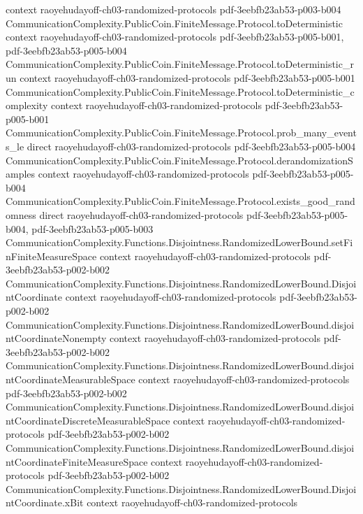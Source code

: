 \begin{theorem}
  {context}
  {raoyehudayoff-ch03-randomized-protocols}
  {pdf-3eebfb23ab53-p003-b004}
\proofstep
  {CommunicationComplexity.PublicCoin.FiniteMessage.Protocol.toDeterministic}
  {context}
  {raoyehudayoff-ch03-randomized-protocols}
  {pdf-3eebfb23ab53-p005-b001,
    pdf-3eebfb23ab53-p005-b004}
\proofstep
  {CommunicationComplexity.PublicCoin.FiniteMessage.Protocol.toDeterministic_run}
  {context}
  {raoyehudayoff-ch03-randomized-protocols}
  {pdf-3eebfb23ab53-p005-b001}
\proofstep
  {CommunicationComplexity.PublicCoin.FiniteMessage.Protocol.toDeterministic_complexity}
  {context}
  {raoyehudayoff-ch03-randomized-protocols}
  {pdf-3eebfb23ab53-p005-b001}
\proofstep
  {CommunicationComplexity.PublicCoin.FiniteMessage.Protocol.prob_many_events_le}
  {direct}
  {raoyehudayoff-ch03-randomized-protocols}
  {pdf-3eebfb23ab53-p005-b004}
\proofstep
  {CommunicationComplexity.PublicCoin.FiniteMessage.Protocol.derandomizationSamples}
  {context}
  {raoyehudayoff-ch03-randomized-protocols}
  {pdf-3eebfb23ab53-p005-b004}
\proofstep
  {CommunicationComplexity.PublicCoin.FiniteMessage.Protocol.exists_good_randomness}
  {direct}
  {raoyehudayoff-ch03-randomized-protocols}
  {pdf-3eebfb23ab53-p005-b004,
    pdf-3eebfb23ab53-p005-b003}
\proofstep
  {CommunicationComplexity.Functions.Disjointness.RandomizedLowerBound.setFinFiniteMeasureSpace}
  {context}
  {raoyehudayoff-ch03-randomized-protocols}
  {pdf-3eebfb23ab53-p002-b002}
\proofstep
  {CommunicationComplexity.Functions.Disjointness.RandomizedLowerBound.DisjointCoordinate}
  {context}
  {raoyehudayoff-ch03-randomized-protocols}
  {pdf-3eebfb23ab53-p002-b002}
\proofstep
  {CommunicationComplexity.Functions.Disjointness.RandomizedLowerBound.disjointCoordinateNonempty}
  {context}
  {raoyehudayoff-ch03-randomized-protocols}
  {pdf-3eebfb23ab53-p002-b002}
\proofstep
  {CommunicationComplexity.Functions.Disjointness.RandomizedLowerBound.disjointCoordinateMeasurableSpace}
  {context}
  {raoyehudayoff-ch03-randomized-protocols}
  {pdf-3eebfb23ab53-p002-b002}
\proofstep
  {CommunicationComplexity.Functions.Disjointness.RandomizedLowerBound.disjointCoordinateDiscreteMeasurableSpace}
  {context}
  {raoyehudayoff-ch03-randomized-protocols}
  {pdf-3eebfb23ab53-p002-b002}
\proofstep
  {CommunicationComplexity.Functions.Disjointness.RandomizedLowerBound.disjointCoordinateFiniteMeasureSpace}
  {context}
  {raoyehudayoff-ch03-randomized-protocols}
  {pdf-3eebfb23ab53-p002-b002}
\proofstep
  {CommunicationComplexity.Functions.Disjointness.RandomizedLowerBound.DisjointCoordinate.xBit}
  {context}
  {raoyehudayoff-ch03-randomized-protocols}

\end{theorem}
